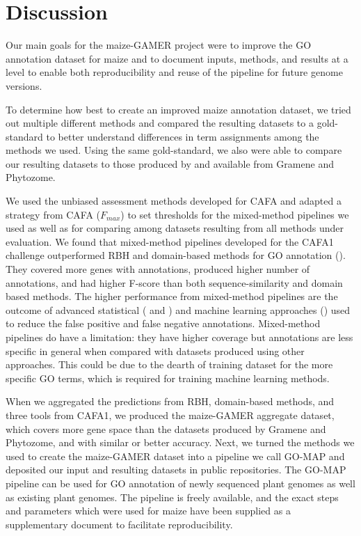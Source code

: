 \section{Discussion}
Our main goals for the maize-GAMER project were to improve the GO annotation dataset for maize and to document inputs, methods, and results at a level to enable both reproducibility and reuse of the pipeline for future genome versions. 

To determine how best to create an improved maize annotation dataset, we tried out multiple different methods and compared the resulting datasets to a gold-standard to better understand differences in term assignments among the methods we used.  Using the same gold-standard, we also were able to compare our resulting datasets to those produced by and available from Gramene and Phytozome. 

We used the unbiased assessment methods developed for CAFA and adapted a strategy from CAFA ($F_{max}$) to set thresholds for the mixed-method pipelines we used as well as for comparing among datasets resulting from all methods under evaluation. We found that mixed-method pipelines developed for the CAFA1 challenge outperformed RBH and domain-based methods for GO annotation (\cite{radivojac_2013-YN}). They covered more genes with annotations, produced higher number of annotations, and had higher F-score than both sequence-similarity and domain based methods. The higher performance from mixed-method pipelines are the outcome of advanced statistical (\cite{falda_2012-VX} and \cite{koskinen_2015-sl}) and machine learning approaches (\cite{clark_2011--Z}) used to reduce the false positive and false negative annotations. Mixed-method pipelines do have a limitation: they have higher coverage but annotations are less specific in general when compared with datasets produced using other approaches. This could be due to the dearth of training dataset for the more specific GO terms, which is required for training machine learning methods. 

When we aggregated the predictions from RBH, domain-based methods, and three tools from CAFA1, we produced the maize-GAMER aggregate dataset, which covers more gene space than the datasets produced by Gramene and Phytozome, and with similar or better accuracy. Next, we turned the methods we used to create the maize-GAMER dataset into a pipeline we call GO-MAP and deposited our input and resulting datasets in public repositories.  The GO-MAP pipeline can be used for GO annotation of newly sequenced plant genomes as well as existing plant genomes. The pipeline is freely available, and the exact steps and parameters which were used for maize have been supplied as a supplementary document to facilitate reproducibility. 

